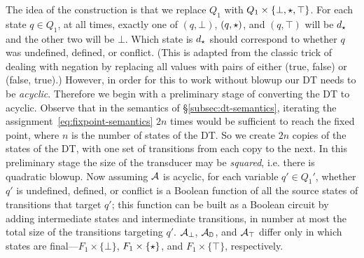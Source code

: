 The idea of the construction is that we replace $Q_1$ with $Q_1 \times \{\bot, \star,\top\}$. For each state $q \in Q_1$, at all times, exactly one of $(q, \bot)$, $(q, \star)$, and $(q, \top)$ will be $d_\star$ and the other two will be $\bot$. Which state is $d_\star$ should correspond to whether $q$ was undefined, defined, or conflict. (This is adapted from the classic trick of dealing with negation by replacing all values with pairs of either (true, false) or (false, true).) However, in order for this to work without blowup our DT needs to be \emph{acyclic}. Therefore we begin with a preliminary stage of converting the DT to acyclic. Observe that in the semantics of \S\ref{subsec:dt-semantics}, iterating the assignment~\eqref{eq:fixpoint-semantics} $2n$ times would be sufficient to reach the fixed point, where $n$ is the number of states of the DT. So we create $2n$ copies of the states of the DT, with one set of transitions from each copy to the next. In this preliminary stage the size of the transducer may be \emph{squared}, i.e. there is quadratic blowup. Now assuming $\mathcal{A}$ is acyclic, for each variable $q' \in Q_1'$, whether $q'$ is undefined, defined, or conflict is a Boolean function of all the source states of transitions that target $q'$; this function can be built as a Boolean circuit by adding intermediate states and intermediate transitions, in number at most the total size of the transitions targeting $q'$.
$\mathcal{A}_\bot$, $\mathcal{A}_{\mathbb{D}}$, and $\mathcal{A}_\top$ differ only in which states are final---$F_1 \times \{\bot\}$, $F_1 \times \{\star\}$, and $F_1 \times \{\top\}$, respectively.

% 


